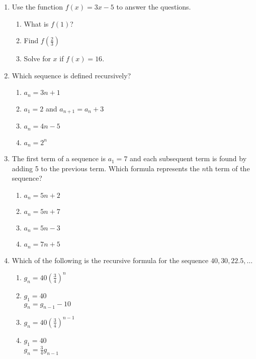 \documentclass[12pt, twoside]{article}
\begin{document}
\begin{enumerate}[itemsep=0.5cm]
\item Use the function $f(x) = 3x-5$ to answer the questions.
  \begin{multicols}{2}
  \begin{enumerate}[itemsep=2cm]
      \item What is $f(1)$?
      \item Find $f(\frac{2}{3})$
      \item Solve for $x$ if $f(x) = 16$.
  \end{enumerate}
  \end{multicols} \vspace{1cm}

\newpage

\item Which sequence is defined recursively?
\begin{enumerate}
    \item $a_n = 3n + 1$
    \item $a_1 = 2$ and $a_{n+1} = a_n + 3$
    \item $a_n = 4n - 5$
    \item $a_n = 2^n$
\end{enumerate}

\item The first term of a sequence is $a_1 = 7$ and each subsequent term is found by adding 5 to the previous term. Which formula represents the $n$th term of the sequence?
\begin{enumerate}
    \item $a_n = 5n + 2$
    \item $a_n = 5n + 7$
    \item $a_n = 5n - 3$
    \item $a_n = 7n + 5$
\end{enumerate}

\item Which of the following is the recursive formula for the sequence $40, 30, 22.5, \ldots$
  \begin{multicols}{2}
  \begin{enumerate}
    \item $g_n = 40 \left( \frac{3}{4} \right)^n$
    \item $g_1 = 40$ \\ $g_n = g_{n-1} -10$
    \item $g_n = 40 \left( \frac{3}{4} \right)^{n-1}$
    \item $g_1 = 40$ \\ $g_n = \frac{3}{4} g_{n-1}$
  \end{enumerate}
  \end{multicols}


\end{enumerate}
\end{document}
